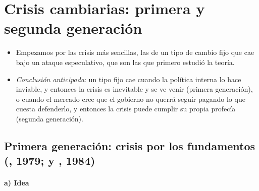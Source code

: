 \documentclass[11pt]{article}
\begin{document}
\section{Crisis cambiarias: primera y segunda generación}\label{sec:cambiarias}

\begin{itemize}
\item Empezamos por las crisis más sencillas, las de un tipo de cambio fijo que cae bajo un ataque especulativo, que son las que primero estudió la teoría.
\item \emph{Conclusión anticipada}: un tipo fijo cae cuando la política interna lo hace inviable, y entonces la crisis es inevitable y se ve venir (primera generación), o cuando el mercado cree que el gobierno no querrá seguir pagando lo que cuesta defenderlo, y entonces la crisis puede cumplir su propia profecía (segunda generación).
\end{itemize}

\subsection{Primera generación: crisis por los fundamentos\cortetitulo{} (, 1979;  y , 1984)}\label{sec:primera}

\paragraph{a) Idea}
\end{document}
